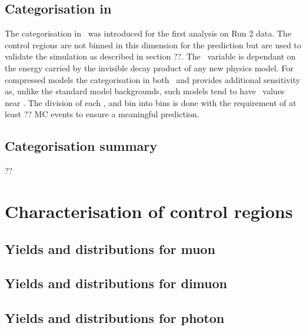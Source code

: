 \subsection{Categorisation in \mht}

The categorisation in \mht~was introduced for the first analysis on
Run 2 data. The control regions are not binned in this dimension 
for the prediction but are used to validate the simulation as described
in section ??. The \mht~variable is dependant on the energy carried by
the invisible decay product of any new physics model. For compressed 
models the categorisation in both \scalht~and \mht provides additional 
sensitivity as, unlike the standard model backgrounds, such models tend to 
have \mht~values near \scalht. The division of each \scalht, \njet 
and \nb bin into \mht bins is done with the requirement of at least ??
MC events to ensure a meaningful prediction.

\subsection{Categorisation summary}

??
\section{Characterisation of control regions}
\subsection{Yields and distributions for muon}
\subsection{Yields and distributions for dimuon}
\subsection{Yields and distributions for photon}
